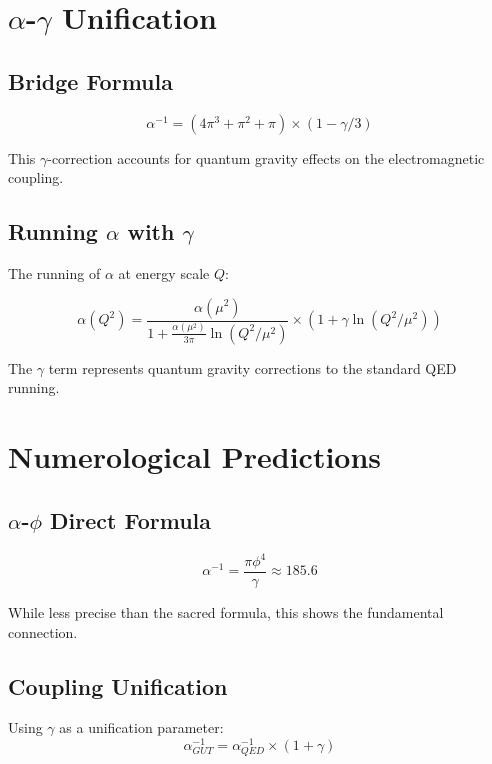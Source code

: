\documentclass[12pt,a4paper]{article}
\begin{document}
\section{$\alpha$-$\gamma$ Unification}

\subsection{Bridge Formula}

\begin{equation}
\alpha^{-1} = (4\pi^3 + \pi^2 + \pi) \times (1 - \gamma/3)
\end{equation}

This $\gamma$-correction accounts for quantum gravity effects on the electromagnetic coupling.

\subsection{Running $\alpha$ with $\gamma$}

The running of $\alpha$ at energy scale $Q$:

\begin{equation}
\alpha(Q^2) = \frac{\alpha(\mu^2)}{1 + \frac{\alpha(\mu^2)}{3\pi}\ln(Q^2/\mu^2)} \times (1 + \gamma \ln(Q^2/\mu^2))
\end{equation}

The $\gamma$ term represents quantum gravity corrections to the standard QED running.

\section{Numerological Predictions}

\subsection{$\alpha$-$\phi$ Direct Formula}

\begin{equation}
\alpha^{-1} = \frac{\pi \phi^4}{\gamma} \approx 185.6
\end{equation}

While less precise than the sacred formula, this shows the fundamental connection.

\subsection{Coupling Unification}

Using $\gamma$ as a unification parameter:
\begin{equation}
\alpha_{GUT}^{-1} = \alpha_{QED}^{-1} \times (1 + \gamma)
\end{equation}
\end{document}
